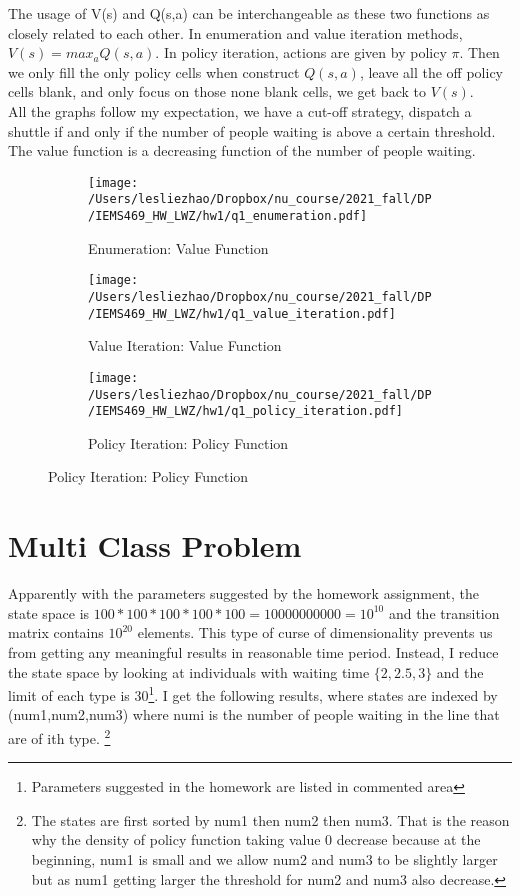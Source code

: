 \documentclass[12pt,letterpaper]{article}
\begin{document}
The usage of V(s) and Q(s,a) can be interchangeable as these two functions as closely related to each other. In enumeration and value iteration methods, $V(s)=max_{a} Q(s,a)$. In policy iteration, actions are given by policy $\pi$. Then we only fill the only policy cells when construct $Q(s,a)$, leave all the off policy cells blank, and only focus on those none blank cells, we get back to $V(s)$.\\

All the graphs follow my expectation, we have a cut-off strategy, dispatch a shuttle if and only if the number of people waiting is above a certain threshold. The value function is a decreasing function of the number of people waiting. 
\begin{figure}[H]
	\centering
	\caption{Single Class Problem}
	\begin{subfigure}[h]{0.48\textwidth}
		\centering
		\texttt{[image: /Users/lesliezhao/Dropbox/nu\_course/2021\_fall/DP/IEMS469\_HW\_LWZ/hw1/q1\_enumeration.pdf]}
		\caption{Enumeration: Value Function}
	\end{subfigure}
	\begin{subfigure}[h]{0.48\textwidth}
		\centering
		\texttt{[image: /Users/lesliezhao/Dropbox/nu\_course/2021\_fall/DP/IEMS469\_HW\_LWZ/hw1/q1\_value\_iteration.pdf]}
		\caption{Value Iteration: Value Function}
	\end{subfigure}
	\begin{subfigure}[h]{0.48\textwidth}
		\centering
		\texttt{[image: /Users/lesliezhao/Dropbox/nu\_course/2021\_fall/DP/IEMS469\_HW\_LWZ/hw1/q1\_policy\_iteration.pdf]}
		\caption{Policy Iteration: Policy Function}
	\end{subfigure}
	\label{votemap}
\end{figure}

\section{Multi Class Problem}
Apparently with the parameters suggested by the homework assignment, the state space is $100*100*100*100*100=10000000000=10^{10}$ and the transition matrix contains $10^{20}$ elements. This type of curse of dimensionality prevents us from getting any meaningful results in  reasonable time period. Instead, I reduce the state space by looking at individuals with waiting time $\{2,2.5,3\}$ and the limit of each type is 30\footnote{Parameters suggested in the homework are listed in commented area}. I get the following results, where states are indexed by (num1,num2,num3) where numi is the number of people waiting in the line that are of ith type. \footnote{The states are first sorted by num1 then num2 then num3. That is the reason why the density of policy function taking value 0 decrease because at the beginning, num1 is small and we allow num2 and num3 to be slightly larger but as num1 getting larger the threshold for num2 and num3 also decrease.} \\
\end{document}
